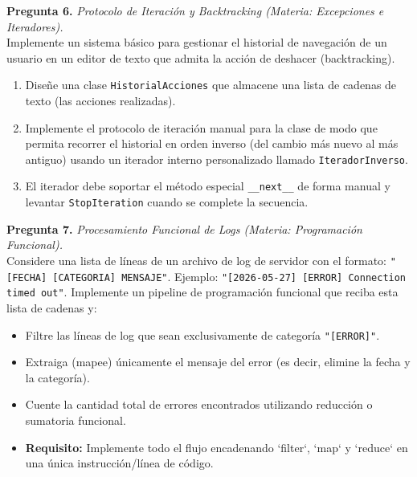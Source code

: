 \documentclass[12pt,letterpaper]{article}
\begin{document}
\textbf{Pregunta 6.} \textit{Protocolo de Iteración y Backtracking (Materia: Excepciones e Iteradores).} \\
Implemente un sistema básico para gestionar el historial de navegación de un usuario en un editor de texto que admita la acción de deshacer (backtracking).
\begin{enumerate}[label=\alph*)]
  \item Diseñe una clase \texttt{HistorialAcciones} que almacene una lista de cadenas de texto (las acciones realizadas).
  \item Implemente el protocolo de iteración manual para la clase de modo que permita recorrer el historial en orden inverso (del cambio más nuevo al más antiguo) usando un iterador interno personalizado llamado \texttt{IteradorInverso}.
  \item El iterador debe soportar el método especial \texttt{\_\_next\_\_} de forma manual y levantar \texttt{StopIteration} cuando se complete la secuencia.
\end{enumerate}

\bigskip

\textbf{Pregunta 7.} \textit{Procesamiento Funcional de Logs (Materia: Programación Funcional).} \\
Considere una lista de líneas de un archivo de log de servidor con el formato: \texttt{"[FECHA] [CATEGORIA] MENSAJE"}. Ejemplo: \texttt{"[2026-05-27] [ERROR] Connection timed out"}.
Implemente un pipeline de programación funcional que reciba esta lista de cadenas y:
\begin{itemize}
  \item Filtre las líneas de log que sean exclusivamente de categoría \texttt{"[ERROR]"}.
  \item Extraiga (mapee) únicamente el mensaje del error (es decir, elimine la fecha y la categoría).
  \item Cuente la cantidad total de errores encontrados utilizando reducción o sumatoria funcional.
  \item \textbf{Requisito:} Implemente todo el flujo encadenando `filter`, `map` y `reduce` en una única instrucción/línea de código.
\end{itemize}

\bigskip
\end{document}
